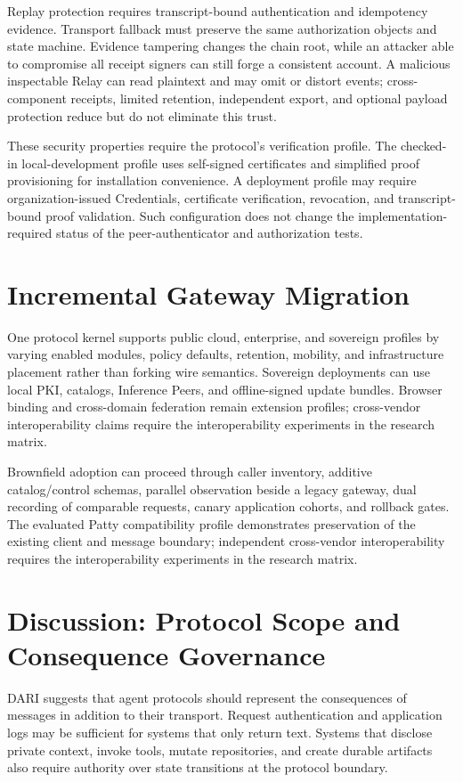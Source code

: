 \documentclass[10pt]{article}
\begin{document}
Replay protection requires transcript-bound authentication and idempotency evidence. Transport fallback must preserve the same authorization objects and state machine. Evidence tampering changes the chain root, while an attacker able to compromise all receipt signers can still forge a consistent account. A malicious inspectable Relay can read plaintext and may omit or distort events; cross-component receipts, limited retention, independent export, and optional payload protection reduce but do not eliminate this trust.

These security properties require the protocol's verification profile. The checked-in local-development profile uses self-signed certificates and simplified proof provisioning for installation convenience. A deployment profile may require organization-issued Credentials, certificate verification, revocation, and transcript-bound proof validation. Such configuration does not change the implementation-required status of the peer-authenticator and authorization tests.

\section{Incremental Gateway Migration}

One protocol kernel supports public cloud, enterprise, and sovereign profiles by varying enabled modules, policy defaults, retention, mobility, and infrastructure placement rather than forking wire semantics. Sovereign deployments can use local PKI, catalogs, Inference Peers, and offline-signed update bundles. Browser binding and cross-domain federation remain extension profiles; cross-vendor interoperability claims require the interoperability experiments in the research matrix.

Brownfield adoption can proceed through caller inventory, additive catalog/control schemas, parallel observation beside a legacy gateway, dual recording of comparable requests, canary application cohorts, and rollback gates. The evaluated Patty compatibility profile demonstrates preservation of the existing client and message boundary; independent cross-vendor interoperability requires the interoperability experiments in the research matrix.

\section{Discussion: Protocol Scope and Consequence Governance}

DARI suggests that agent protocols should represent the consequences of messages in addition to their transport. Request authentication and application logs may be sufficient for systems that only return text. Systems that disclose private context, invoke tools, mutate repositories, and create durable artifacts also require authority over state transitions at the protocol boundary.
\end{document}

